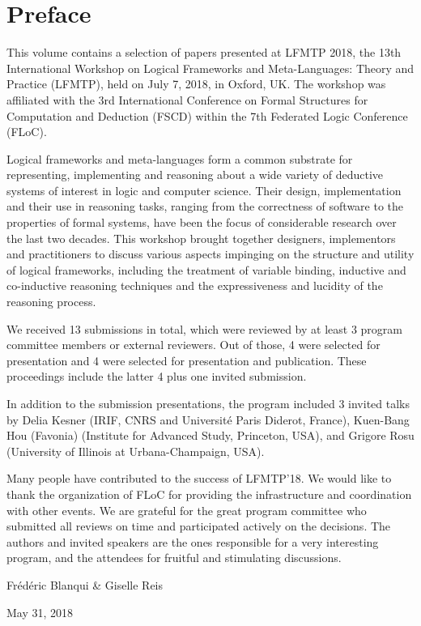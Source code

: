 \documentclass[submission,copyright,creativecommons]{eptcs}
\begin{document}
\section*{Preface}

This volume contains a selection of papers presented at LFMTP 2018,
the 13th International Workshop on Logical Frameworks and
Meta-Languages: Theory and Practice (LFMTP), held on July 7, 2018, in
Oxford, UK. The workshop was affiliated with the 3rd International
Conference on Formal Structures for Computation and Deduction (FSCD)
within the 7th Federated Logic Conference (FLoC).

Logical frameworks and meta-languages form a common substrate for
representing, implementing and reasoning about a wide variety of
deductive systems of interest in logic and computer science. Their
design, implementation and their use in reasoning tasks, ranging from
the correctness of software to the properties of formal systems, have
been the focus of considerable research over the last two
decades. This workshop brought together designers, implementors and
practitioners to discuss various aspects impinging on the structure
and utility of logical frameworks, including the treatment of variable
binding, inductive and co-inductive reasoning techniques and the
expressiveness and lucidity of the reasoning process.

We received 13 submissions in total, which were reviewed by at least 3
program committee members or external reviewers. Out of those, 4 were
selected for presentation and 4 were selected for presentation and
publication. These proceedings include the latter 4 plus one invited
submission.

In addition to the submission presentations, the program included 3
invited talks by Delia Kesner (IRIF, CNRS and Universit\'{e} Paris
Diderot, France), Kuen-Bang Hou (Favonia) (Institute for Advanced
Study, Princeton, USA), and Grigore Rosu (University of Illinois at
Urbana-Champaign, USA).

Many people have contributed to the success of LFMTP'18. We would like
to thank the organization of FLoC for providing the infrastructure and
coordination with other events. We are grateful for the great program
committee who submitted all reviews on time and participated actively
on the decisions.  The authors and invited speakers are the ones
responsible for a very interesting program, and the attendees for
fruitful and stimulating discussions.
\medskip

\begin{flushright}
Fr\'{e}d\'{e}ric Blanqui \& Giselle Reis

May 31, 2018
\end{flushright}
\end{document}
